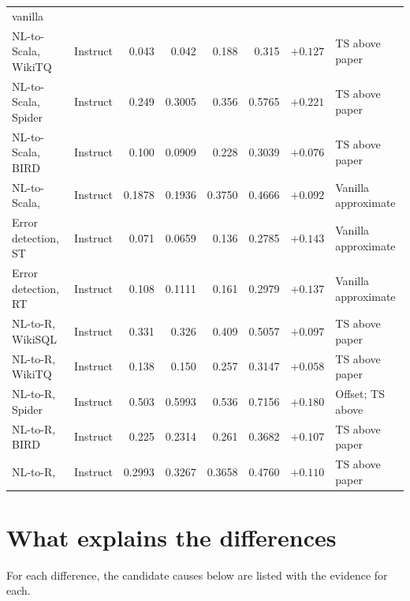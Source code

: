 {\begin{longtable}{@{}p{2.6cm}p{1.5cm}rrrrrp{2.8cm}@{}}
vanilla\\
NL-to-Scala, WikiTQ & Instruct & 0.043 & 0.042 & 0.188 & 0.315 & $+0.127$ & TS above paper\\
NL-to-Scala, Spider & Instruct & 0.249 & 0.3005 & 0.356 & 0.5765 & $+0.221$ & TS above paper\\
NL-to-Scala, BIRD & Instruct & 0.100 & 0.0909 & 0.228 & 0.3039 & $+0.076$ & TS above paper\\
NL-to-Scala, \ZSiv{} & Instruct & 0.1878 & 0.1936 & 0.3750 & 0.4666 & $+0.092$ & Vanilla
approximate\\
Error detection, ST & Instruct & 0.071 & 0.0659 & 0.136 & 0.2785 & $+0.143$ & Vanilla
approximate\\
Error detection, RT & Instruct & 0.108 & 0.1111 & 0.161 & 0.2979 & $+0.137$ & Vanilla
approximate\\
NL-to-R, WikiSQL & Instruct & 0.331 & 0.326 & 0.409 & 0.5057 & $+0.097$ & TS above paper\\
NL-to-R, WikiTQ & Instruct & 0.138 & 0.150 & 0.257 & 0.3147 & $+0.058$ & TS above paper\\
NL-to-R, Spider & Instruct & 0.503 & 0.5993 & 0.536 & 0.7156 & $+0.180$ & Offset; TS above\\
NL-to-R, BIRD & Instruct & 0.225 & 0.2314 & 0.261 & 0.3682 & $+0.107$ & TS above paper\\
NL-to-R, \ZSiv{} & Instruct & 0.2993 & 0.3267 & 0.3658 & 0.4760 & $+0.110$ & TS above paper\\
\end{longtable}
}

\section{What explains the differences}

For each difference, the candidate causes below are listed with the evidence for each.

